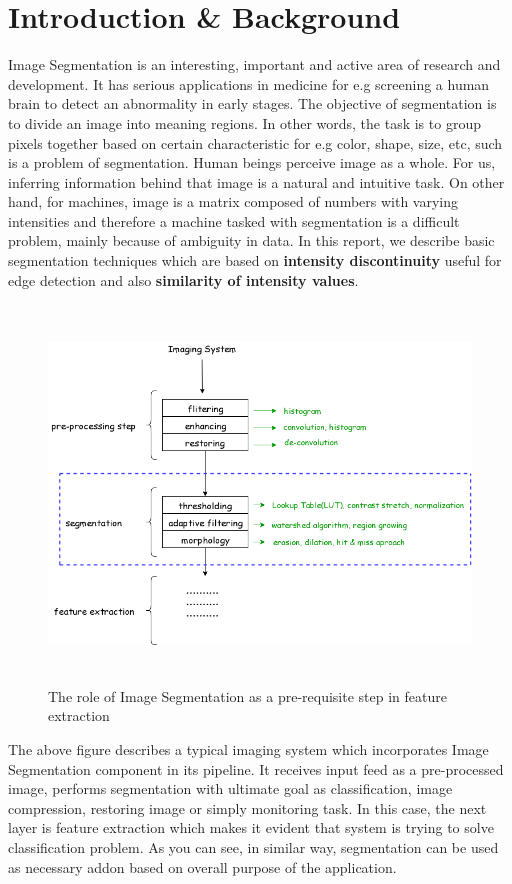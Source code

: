 \chapter{Introduction \& Background}
Image Segmentation is an interesting, important and active area of research and development. It has serious applications in medicine for e.g screening a human brain to detect an abnormality in early stages. The objective of segmentation is to divide an image into meaning regions. In other words, the task is to group pixels together based on certain characteristic for e.g color, shape, size, etc, such is a problem of segmentation. Human beings perceive image as a whole. For us, inferring information behind that image is a natural and intuitive task. On other hand, for machines, image is a matrix composed of numbers with varying intensities and therefore a machine tasked with segmentation is a difficult problem, mainly because of ambiguity in data. In this report, we  describe basic segmentation techniques which are based on \textbf{intensity discontinuity} useful for edge detection and also \textbf{similarity of intensity values}.
\begin{figure}[h]
  \includegraphics[width=15cm,height=10cm,keepaspectratio]{img/role_of_img_seg_diagram.png}
  \caption{The role of Image Segmentation as a pre-requisite step in feature extraction}
\end{figure}
The above figure describes a typical imaging system which incorporates Image Segmentation component in its pipeline. It receives input feed as a pre-processed image, performs segmentation with ultimate goal as classification, image compression, restoring image or simply monitoring task. In this case, the next layer is feature extraction which makes it evident that system is trying to solve classification problem. As you can see, in similar way, segmentation can be used as necessary addon based on overall purpose of the application.
